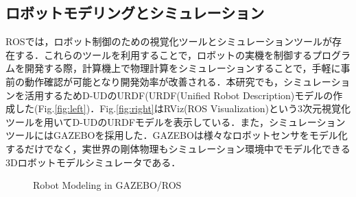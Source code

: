 \documentclass[12pt]{sonota/aislab}
\begin{document}
\subsection{ロボットモデリングとシミュレーション}
ROSでは，ロボット制御のための視覚化ツールとシミュレーションツールが存在する．これらのツールを利用することで，ロボットの実機を制御するプログラムを開発する際，計算機上で物理計算をシミュレーションすることで，手軽に事前の動作確認が可能となり開発効率が改善される．本研究でも，シミュレーションを活用するためD-UDのURDF(URDF(Unified
Robot Description)モデルの作成した(Fig.\ref{fig:left})．Fig.\ref{fig:right}はRViz(ROS Visualization)という3次元視覚化ツールを用いてD-UDのURDFモデルを表示している．また，シミュレーションツールにはGAZEBO\cite{GAZEBO}を採用した．GAZEBOは様々なロボットセンサをモデル化するだけでなく，実世界の剛体物理もシミュレーション環境中でモデル化できる3Dロボットモデルシミュレータである．

\begin{figure}[tbp]
	\begin{center}
	\hspace{5mm}
	\end{center}
	\caption{Robot Modeling in GAZEBO/ROS}
	\label{fig:Modeling}
\end{figure}
\end{document}
